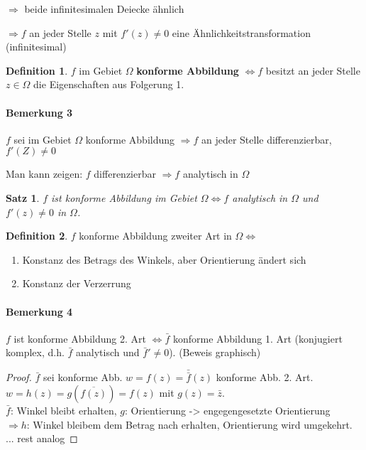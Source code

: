 \documentclass[ngerman,halfparskip]{scrartcl}
\newtheorem{satz}{Satz}[section]
\theoremstyle{definition}
\newtheorem{defin}{Definition}[section]
\begin{document}
$\Rightarrow$ beide infinitesimalen Deiecke ähnlich

$\Rightarrow f$ an jeder Stelle $z$ mit $f'(z)\neq 0$ eine Ähnlichkeitstransformation (infinitesimal)

\begin{defin}
$f$ im Gebiet $\Omega$ \textbf{konforme Abbildung} $\Leftrightarrow f$ besitzt an jeder Stelle $z\in\Omega$ die Eigenschaften aus Folgerung 1. 
\end{defin}

\paragraph{Bemerkung 3} $f$ sei im Gebiet $\Omega$ konforme Abbildung $\Rightarrow f$ an jeder Stelle differenzierbar, $f'(Z)\neq 0$

Man kann zeigen: $f$ differenzierbar $\Rightarrow f$ analytisch in $\Omega$

\begin{satz}
$f$ ist konforme Abbildung im Gebiet $\Omega \Leftrightarrow f$ analytisch in $\Omega$ und $f'(z)\neq 0$ in $\Omega$.
\end{satz}

\begin{defin}
$f$ konforme Abbildung zweiter Art in $\Omega \Leftrightarrow$ 
\begin{enumerate}
\item Konstanz des Betrags des Winkels, aber Orientierung ändert sich
\item Konstanz der Verzerrung
\end{enumerate}
\end{defin}

\paragraph{Bemerkung 4} $f$ ist konforme Abbildung 2. Art $\Leftrightarrow \bar f$ konforme Abbildung 1. Art (konjugiert komplex, d.h. $\bar f$ analytisch und $\bar f'\neq 0$).
(Beweis graphisch)
\begin{proof}
$\bar f$ sei konforme Abb. $w=f(z)=\bar{\bar f}(z)$ konforme Abb. 2. Art. $w=h(z)=g(\overline{f(z)})=f(z)$ mit $g(z)=\bar z$.\\
 $\bar f$: Winkel bleibt erhalten, $g$: Orientierung -> engegengesetzte Orientierung\\
 $\Rightarrow h$: Winkel bleibem dem Betrag nach erhalten, Orientierung wird umgekehrt.
 ... rest analog
\end{proof}
\end{document}
